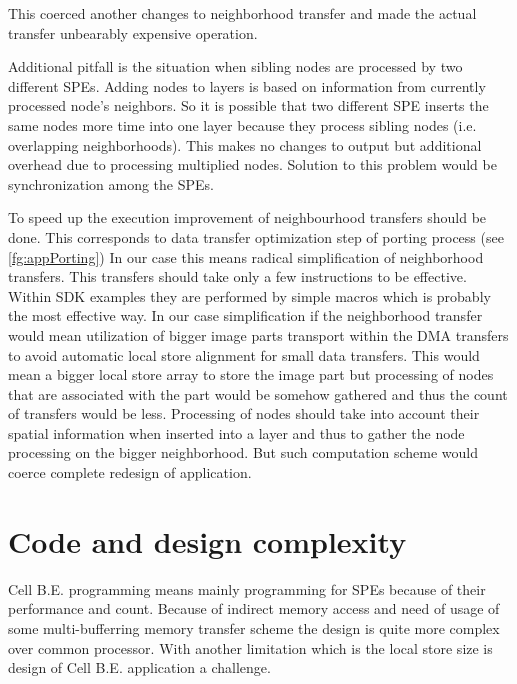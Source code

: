 \par
This coerced another changes to neighborhood transfer and made the actual transfer unbearably expensive operation.

\par
\label{workDependecy}
Additional pitfall is the situation when sibling nodes are processed by two different SPEs.
Adding nodes to layers is based on information from currently processed node's neighbors.
So it is possible that two different SPE inserts the same nodes more time into one layer because they process sibling nodes (i.e. overlapping neighborhoods).
This makes no changes to output but additional overhead due to processing multiplied nodes.
Solution to this problem would be synchronization among the SPEs.

\par
To speed up the execution improvement of neighbourhood transfers should be done.
This corresponds to data transfer optimization step of porting process (see \ref{fg:appPorting})
In our case this means radical simplification of neighborhood transfers.
This transfers should take only a few instructions to be effective.
Within SDK examples they are performed by simple macros which is probably the most effective way.
In our case simplification if the neighborhood transfer would mean utilization of bigger image parts transport within the DMA transfers to avoid automatic local store alignment for small data transfers.
This would mean a bigger local store array to store the image part but processing of nodes that are associated with the part would be somehow gathered and thus the count of transfers would be less.
Processing of nodes should take into account their spatial information when inserted into a layer and thus to gather the node processing on the bigger neighborhood.
But such computation scheme would coerce complete redesign of application.

\section{Code and design complexity}

\par
Cell B.E. programming means mainly programming for SPEs because of their performance and count.
Because of indirect memory access and need of usage of some multi-bufferring memory transfer scheme the design is quite more complex over common processor.
With another limitation which is the local store size is design of Cell B.E. application a challenge.

